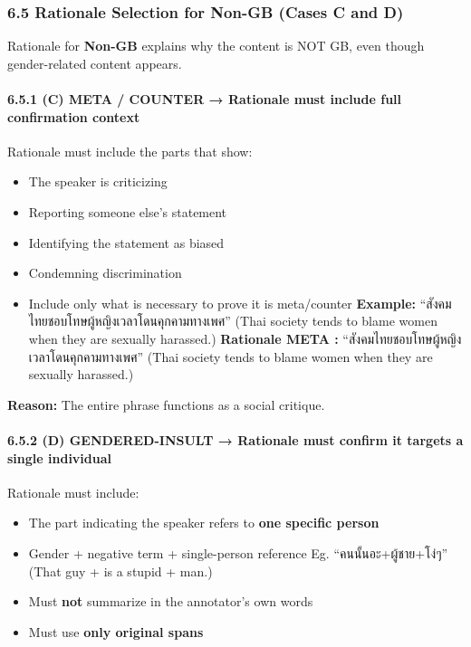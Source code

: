 \documentclass[12pt,oneside,openright,a4paper]{cpe-english-project}
\begin{document}
\subsubsection{6.5 Rationale Selection for Non-GB (Cases C and D)}\label{rationale-selection-for-non-gb-cases-c-and-d}

Rationale for \textbf{Non-GB} explains why the content is NOT GB, even
though gender-related content appears.

\paragraph{6.5.1 (C) META / COUNTER → Rationale must include full confirmation context}\label{c-meta-counter-rationale-must-include-full-confirmation-context}

Rationale must include the parts that show:

\begin{itemize}
\setlength{\itemsep}{0.15\baselineskip}
\setlength{\parsep}{0pt}
\setlength{\parskip}{0pt}
\item
  The speaker is criticizing
\item
  Reporting someone else's statement
\item
  Identifying the statement as biased
\item
  Condemning discrimination
\item
  Include only what is necessary to prove it is meta/counter
  \textbf{Example:} ``สังคมไทยชอบโทษผู้หญิงเวลาโดนคุกคามทางเพศ''
  (Thai society tends to blame women when they are sexually harassed.)
  \textbf{Rationale META :} ``สังคมไทยชอบโทษผู้หญิงเวลาโดนคุกคามทางเพศ''
  (Thai society tends to blame women when they are sexually harassed.)
\end{itemize}

\textbf{Reason:} The entire phrase functions as a social critique.

\paragraph{6.5.2 (D) GENDERED-INSULT → Rationale must confirm it targets a single individual}

Rationale must include:

\begin{itemize}
\setlength{\itemsep}{0.15\baselineskip}
\setlength{\parsep}{0pt}
\setlength{\parskip}{0pt}
\item
  The part indicating the speaker refers to \textbf{one specific
  person}
\item
  Gender + negative term + single-person reference Eg.
  ``คนนั้นอะ+ผู้ชาย+โง่ๆ'' (That guy + is a stupid + man.)
\item
  Must \textbf{not} summarize in the annotator's own words
\item
  Must use \textbf{only original spans}
\end{itemize}
\end{document}
